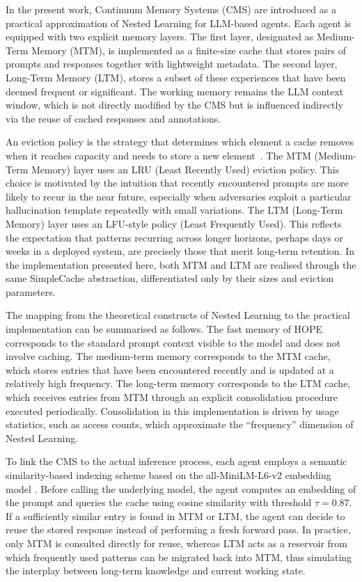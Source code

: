\documentclass[11pt,a4paper]{article}
\begin{document}
	In the present work, Continuum Memory Systems (CMS) are introduced as a practical approximation of Nested Learning for LLM-based agents. Each agent is equipped with two explicit memory layers. The first layer, designated as Medium-Term Memory (MTM), is implemented as a finite-size cache that stores pairs of prompts and responses together with lightweight metadata. The second layer, Long-Term Memory (LTM), stores a subset of these experiences that have been deemed frequent or significant. The working memory remains the LLM context window, which is not directly modified by the CMS but is influenced indirectly via the reuse of cached responses and annotations.
	
	An eviction policy is the strategy that determines which element a cache removes when it reaches capacity and needs to store a new element~\cite{beckmann2018lhd}. The MTM (Medium-Term Memory) layer uses an LRU (Least Recently Used) eviction policy. This choice is motivated by the intuition that recently encountered prompts are more likely to recur in the near future, especially when adversaries exploit a particular hallucination template repeatedly with small variations. The LTM (Long-Term Memory) layer uses an LFU-style policy (Least Frequently Used). This reflects the expectation that patterns recurring across longer horizons, perhaps days or weeks in a deployed system, are precisely those that merit long-term retention. In the implementation presented here, both MTM and LTM are realised through the same SimpleCache abstraction, differentiated only by their sizes and eviction parameters.
	
	The mapping from the theoretical constructs of Nested Learning to the practical implementation can be summarised as follows. The fast memory of HOPE corresponds to the standard prompt context visible to the model and does not involve caching. The medium-term memory corresponds to the MTM cache, which stores entries that have been encountered recently and is updated at a relatively high frequency. The long-term memory corresponds to the LTM cache, which receives entries from MTM through an explicit consolidation procedure executed periodically. Consolidation in this implementation is driven by usage statistics, such as access counts, which approximate the ``frequency'' dimension of Nested Learning.
	
	To link the CMS to the actual inference process, each agent employs a semantic similarity-based indexing scheme based on the all-MiniLM-L6-v2 embedding model \cite{reimers2019sentence}. Before calling the underlying model, the agent computes an embedding of the prompt and queries the cache using cosine similarity with threshold \(\tau=0.87\). If a sufficiently similar entry is found in MTM or LTM, the agent can decide to reuse the stored response instead of performing a fresh forward pass. In practice, only MTM is consulted directly for reuse, whereas LTM acts as a reservoir from which frequently used patterns can be migrated back into MTM, thus simulating the interplay between long-term knowledge and current working state.
	
\end{document}
